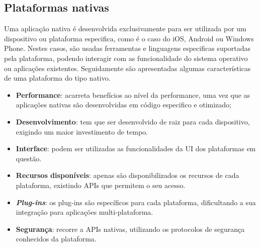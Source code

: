 


\subsection{Plataformas nativas}

Uma aplicação nativa é desenvolvida exclusivamente para ser utilizada por um dispositivo ou plataforma especifica, como é o caso do iOS, Android ou Windows Phone. Nestes casos, são usadas ferramentas e linguagens especificas suportadas pela plataforma, podendo interagir com as funcionalidade do sistema operativo ou aplicações existentes. Seguidamente são apresentadas algumas características de uma plataforma do tipo nativo\cite{Ibm2012a}. 








\begin{itemize}
	\item \textbf{Performance}: acarreta benefícios ao nível da performance, uma vez que as aplicações nativas são desenvolvidas em código especifico e otimizado; 

	
	
	\item \textbf{Desenvolvimento}: tem que ser desenvolvido de raiz para cada dispositivo, exigindo um maior investimento de tempo. 
	
	\item \textbf{Interface}: podem ser utilizadas as funcionalidades da \ac{UI} dos plataformas em questão. 
	
	
	\item \textbf{Recursos disponíveis}: apenas são disponibilizados os recursos de cada plataforma, existindo APIs que permitem o seu acesso. 
	
	

	\item \textbf{\textit{Plug-ins}}: os plug-ins são específicos para cada plataforma, dificultando a sua integração para aplicações multi-plataforma. 
	
	
	\item \textbf{Segurança}: recorre a APIs nativas, utilizando os protocolos de segurança conhecidos da plataforma. 
	
	
\end{itemize}


